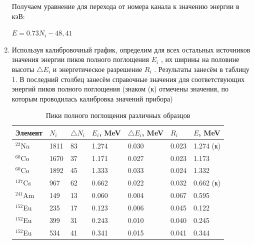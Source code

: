 \documentclass[a4paper]{article}
\begin{document}
\begin{enumerate}
Получаем уравнение для перехода от номера канала к значению энергии в кэВ:
\begin{center}
    $E = 0.73N_i - 48,41$
\end{center}

\item Используя калибровочный график, определим для всех остальных источников значения энергии пиков полного поглощения $E_i$ , их ширины на половине высоты $\triangle E_i$ и энергетическое разрешение $R_i$ . Результаты занесём в таблицу 1. В последний столбец занесём справочные значения для соответствующих энергий пиков полного поглощения (знаком (к) отмечены значения, по которым проводилась калибровка значений прибора)

    \begin{table}[h]
    \centering
    \begin{center}
    \caption{Пики полного поглощения различных образцов}
    \end{center}
    \vspace{0.1cm}
    \label{tab:my_label}
    \begin{tabular}{|p{1.5cm}|p{1.5cm}|p{1.5cm}|p{1.5cm}|p{1.6cm}|p{1.5cm}|p{1.5cm}|}
\hline
  Элемент & $N_i$ & $\triangle N_i$ & $E_i$, MeV & $\triangle E_i$, MeV & $R_i$ & $E$, MeV \\
 \hline
 $^{22}$Na & 1811 & 83 & 1.274 & 0.030 & 0.023 & 1.274 (к) \\
\hline
 $^{60}$Co & 1670 & 37 & 1.171 & 0.027 & 0.023  & 1.173 \\
\hline
 $^{60}$Co & 1892 & 45 & 1.333 & 0.033 & 0.024 & 1.332 \\
\hline
$^{137}$Cs & 967 & 62 & 0.662 & 0.022 & 0.032 & 0.662 (к) \\
\hline
$^{241}$Am & 149 & 13 & 0.060 & 0.004 & 0.067 & 0.595 \\
\hline
$^{152}$Eu & 235 & 17 & 0.123 & 0.006 & 0.045 & 0.122 \\
\hline
$^{152}$Eu & 399 & 31 & 0.243 & 0.010 & 0.040 & 0.245 \\
\hline
$^{152}$Eu & 534 & 41 & 0.341 & 0.015 & 0.041 & 0.344 \\
\hline
 \end{tabular}
\end{table} 


\end{enumerate}
\end{document}
